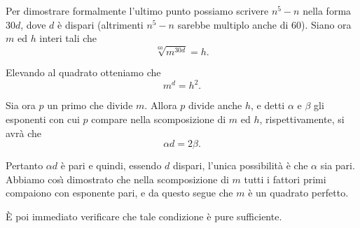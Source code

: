 {Per dimostrare formalmente l'ultimo punto possiamo scrivere $n^{5}-n$ nella forma $30d$, dove $d$ è dispari (altrimenti $n^{5}-n$ sarebbe multiplo anche di 60). Siano ora $m$ ed $h$ interi tali che
$$\sqrt[60]{m^{30d}}=h.$$

Elevando al quadrato otteniamo che
$$m^{d}=h^{2}.$$

Sia ora $p$ un primo che divide $m$. Allora $p$ divide anche $h$, e detti $\alpha$ e $\beta$ gli esponenti con cui $p$ compare nella scomposizione di $m$ ed $h$, rispettivamente, si avrà che
$$\alpha d=2\beta.$$

Pertanto $\alpha d$ è pari e quindi, essendo $d$ dispari, l'unica
possibilità è che $\alpha$ sia pari. Abbiamo cos\`{\i}
dimostrato che nella scomposizione di $m$ tutti i fattori primi compaiono con esponente pari, e da questo segue che $m$ è un quadrato perfetto.

È poi immediato verificare che tale condizione è pure
sufficiente.}

\renewcommand{\SoluzioniAlternative}{
}

\renewcommand{\Osservazioni}{\TitoloOsservazione Abbiamo dimostrato
che $n^{5}-n$ è sempre multiplo di 5 con un ragionamento elementare basato sull'ultima cifra della rappresentazione in base 10 di $n$.  Vale però la pena di ricordare che questo fatto è semplicemente il caso $p=5$ del \emph{piccolo Teorema di Fermat}. Analogamente, tutte le affermazioni che abbiamo fatto su $n^{5}-n$ si possono dimostrare sostituendo ad $n$ i rappresentanti delle classi di
congruenza modulo 3, 4, 5.  }

\renewcommand{\Commenti}{
}